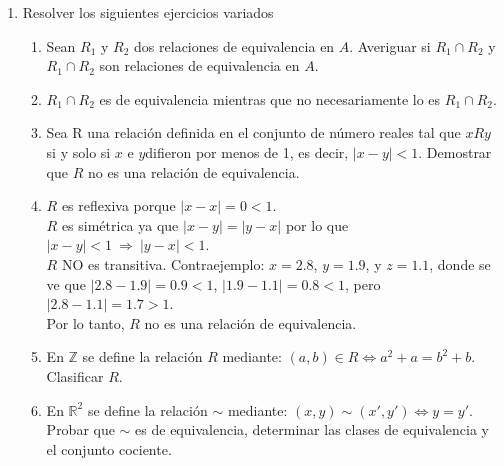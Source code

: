 \documentclass[a4paper]{article}
\newcommand{\answer}{\item[**]}
\newcommand{\exercise}{\item}
\newcommand{\Then}{\Rightarrow}
\newcommand{\Eq}{\Leftrightarrow}
\begin{document}
\begin{enumerate}
\begin{enumerate} [label=(\alph*)]
		\item Verificar que la relación "x nació en el mismo país que y" es una relación de equivalencia y representarla con un grafo. Indicar las clases de equivalencia y el conjunto cociente.
		
		\item Verificar que la relación "x es descendiente de y" es una relación de orden estricto parcial. Representar la relación en un diagrama de Hasse.
		
		\item Explicar porque la relación "x es de la misma edad o mayor que y" NO ES una relación de orden amplio.
		\answer Porque no es antisimétrica. (Mirta)$\mathrel{R}$(José) $\land$ (José)$\mathrel{R}$(Mirta) pero José$\neq$Mirta. También se puede verificar con Luna, Gina y Elena, que tienen la misma edad.
	
	\end{enumerate}

	\exercise Resolver los siguientes ejercicios variados
	\begin{enumerate} [label=(\alph*)]

		\item Sean $R_1$ y $R_2$ dos relaciones de equivalencia en $A$. Averiguar si $R_1 \cap R_2$ y $R_1 \cap R_2$ son relaciones de equivalencia en $A$.
		\answer $R_1 \cap R_2$ es de equivalencia mientras que no necesariamente lo es $R_1 \cap R_2$.

		\item Sea R una relación definida en el conjunto de número reales tal que $x R y$ si y solo si $x$ e $y$difieron por menos de 1, es decir, $|x-y|<1$. Demostrar que $R$ no es una relación de equivalencia.
		\answer $R$ es reflexiva porque $|x - x| = 0 < 1$. \\ $R$ es simétrica ya que $|x - y|=|y - x|$ por lo que $|x-y|<1 ~\Then~ |y - x| < 1$. \\ $R$ NO es transitiva. Contraejemplo: $x = 2.8$, $y = 1.9$, y $z = 1.1$, donde se ve que $|2.8-1.9|=0.9<1$, $|1.9-1.1|=0.8<1$, pero $|2.8-1.1|=1.7>1$. \\ Por lo tanto, $R$ no es una relación de equivalencia.

		\item En $\mathbb{Z}$ se define la relación $R$ mediante: $(a,b) \in R \Eq a^2+a=b^2+b$. Clasificar $R$.

		\item En $\mathbb{R}^2$ se define la relación $\sim$ mediante: $(x,y) \sim (x',y') \Eq y=y'$. Probar que $\sim$ es de equivalencia, determinar las clases de equivalencia y el conjunto cociente.


\end{enumerate}
\end{enumerate}
\end{document}
